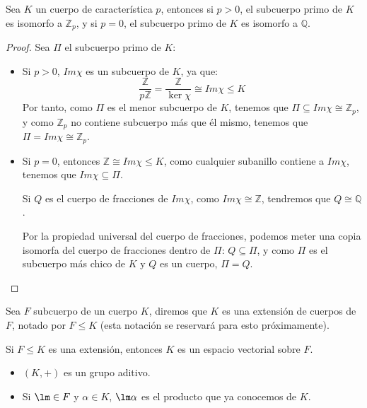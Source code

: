 \begin{prop}
    Sea $K$ un cuerpo de característica $p$, entonces si $p>0$, el subcuerpo primo de $K$ es isomorfo a $\mathbb{Z}_p$, y si $p=0$, el subcuerpo primo de $K$ es isomorfo a $\mathbb{Q}$.
    \begin{proof}
        Sea $\Pi$ el subcuerpo primo de $K$: 
        \begin{itemize}
            \item Si $p>0$, $Im\chi$ es un subcuerpo de $K$, ya que:
                \begin{equation*}
                    \dfrac{\mathbb{Z}}{p\mathbb{Z}} = \dfrac{\mathbb{Z}}{\ker\chi} \cong Im\chi \leq K
                \end{equation*}
                Por tanto, como $\Pi$ es el menor subcuerpo de $K$, tenemos que $\Pi\subseteq Im\chi\cong \mathbb{Z}_p$, y como $\mathbb{Z}_p$ no contiene subcuerpo más que él mismo, tenemos que $\Pi=Im\chi \cong \mathbb{Z}_p$.
            \item Si $p=0$, entonces $\mathbb{Z}\cong Im\chi\leq K$, como cualquier subanillo contiene a $Im\chi$, tenemos que $Im\chi \subseteq \Pi$. 

                Si $Q$ es el cuerpo de fracciones de $Im\chi$, como $Im\chi\cong \mathbb{Z}$, tendremos que $Q\cong \mathbb{Q}$.

                Por la propiedad universal del cuerpo de fracciones, podemos meter una copia isomorfa del cuerpo de fracciones dentro de $\Pi$: $Q\subseteq \Pi$, y como $\Pi$ es el subcuerpo más chico de $K$ y $Q$ es un cuerpo, $\Pi = Q$.
        \end{itemize}
    \end{proof}
\end{prop}

\begin{definicion}
    Sea $F$ subcuerpo de un cuerpo $K$, diremos que $K$ es una extensión de cuerpos de $F$, notado por $F\leq K$ (esta notación se reservará para esto próximamente).
\end{definicion}

\begin{observacion}
    Si $F\leq K$ es una extensión, entonces $K$ es un espacio vectorial sobre $F$.

    \begin{itemize}
        \item $(K,+)$ es un grupo aditivo.
        \item Si $\lm\in F$ y $\alpha\in K$, $\lm \alpha$ es el producto que ya conocemos de $K$.
    \end{itemize}
\end{observacion}

